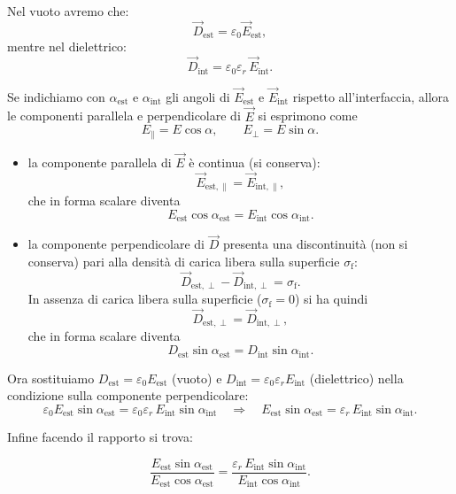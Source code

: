 \documentclass{book}
\begin{document}
Nel vuoto avremo che:
\[
\vec{D}_{\mathrm{est}}=\varepsilon_0\vec{E}_{\mathrm{est}},
\]
mentre nel dielettrico: 
\[
\vec{D}_{\mathrm{int}}=\varepsilon_0\varepsilon_r\,\vec{E}_{\mathrm{int}}.
\]

Se indichiamo con \(\alpha_{\text{est}}\) e \(\alpha_{\text{int}}\) gli angoli di \(\vec{E}_{\text{est}}\) e \(\vec{E}_{\text{int}}\) rispetto all'interfaccia, allora le componenti parallela e perpendicolare di \(\vec{E}\) si esprimono come
\[
E_{\parallel}=E\cos\alpha,\qquad E_{\perp}=E\sin\alpha.
\]

\begin{itemize}
  \item la componente parallela di \(\vec{E}\) è continua (si conserva):
  \[
  \vec{E}_{\mathrm{est},\parallel}=\vec{E}_{\mathrm{int},\parallel},
  \]
  che in forma scalare diventa
  \[
  E_{\mathrm{est}}\cos\alpha_{\mathrm{est}} = E_{\mathrm{int}}\cos\alpha_{\mathrm{int}}.
  \]

  \item la componente perpendicolare di \(\vec{D}\) presenta una discontinuità (non si conserva) pari alla densità di carica libera sulla superficie \(\sigma_{\mathrm{f}}\):
  \[
  \vec{D}_{\mathrm{est},\perp}-\vec{D}_{\mathrm{int},\perp}=\sigma_{\mathrm{f}}.
  \]
  In assenza di carica libera sulla superficie (\(\sigma_{\mathrm{f}}=0\)) si ha quindi
  \[
  \vec{D}_{\mathrm{est},\perp}=\vec{D}_{\mathrm{int},\perp},
  \]
  che in forma scalare diventa
  \[
  D_{\mathrm{est}}\sin\alpha_{\mathrm{est}} = D_{\mathrm{int}}\sin\alpha_{\mathrm{int}}.
  \]
\end{itemize}
\vspace{0.2cm}
Ora sostituiamo \(D_{\mathrm{est}}=\varepsilon_0 E_{\mathrm{est}}\) (vuoto) e \(D_{\mathrm{int}}=\varepsilon_0\varepsilon_r E_{\mathrm{int}}\) (dielettrico) nella condizione sulla componente perpendicolare:
\[
\varepsilon_0 E_{\mathrm{est}}\sin\alpha_{\mathrm{est}}
= \varepsilon_0\varepsilon_r\,E_{\mathrm{int}}\sin\alpha_{\mathrm{int}}
\quad\Longrightarrow\quad
E_{\mathrm{est}}\sin\alpha_{\mathrm{est}} = \varepsilon_r\,E_{\mathrm{int}}\sin\alpha_{\mathrm{int}}.
\]

Infine facendo il rapporto si trova:

\[
\frac{E_{\mathrm{est}}\sin\alpha_{\mathrm{est}}}{E_{\mathrm{est}}\cos\alpha_{\mathrm{est}}}
= \frac{\varepsilon_r\,E_{\mathrm{int}}\sin\alpha_{\mathrm{int}}}{E_{\mathrm{int}}\cos\alpha_{\mathrm{int}}}.
\]
\end{document}
